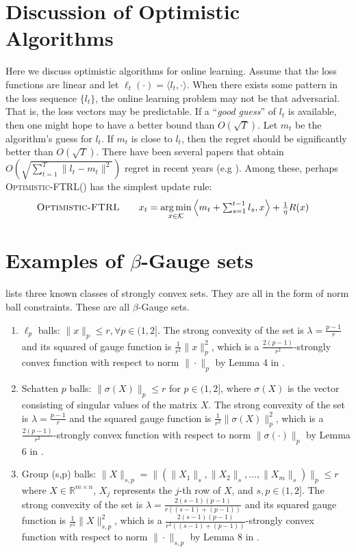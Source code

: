 \documentclass[final,12pt]{colt2018} %
\def\reals{\mathbb{R}}
\def\reals{\mathbb{R}}
\def\K{\mathcal{K}}
\def\argmin{\mathop{\arg\min}}
\def\OFTRL{\textsc{Optimistic-FTRL}\xspace}
\newcommand{\lr}[2]{\left\langle#1,#2\right\rangle}
\begin{document}
\appendix

\section{Discussion of Optimistic Algorithms}\label{app:optimistic}
Here we discuss optimistic algorithms for online learning. Assume that the loss functions are linear and let $\ell_t(\cdot)= \langle l_t , \cdot \rangle$.
When there exists some pattern in the loss sequence $\{ l_t \}$,
the online learning problem may not be that adversarial.
That is, the loss vectors may be predictable. 
If a ``\emph{good guess}'' of $l_t$ is available, then one might hope to have a better bound than $O(\sqrt{T})$. Let $m_t$ be the algorithm's guess for $l_{t}$. If $m_{t}$ is close to $l_{t}$, then the regret should be significantly better than $O(\sqrt{T})$.
There have been several papers that obtain $O(\sqrt{ \sum_{t=1}^T \| l_t -m_t \|^2 } )$ regret in recent years (e.g \cite{CJ12,RK13,SALS15}). 
Among these, perhaps \OFTRL (\cite{SALS15}) has the simplest update rule:
\begin{align}
\OFTRL\quad\quad & x_t = \argmin_{x \in \K}\textstyle \lr{ m_t + \sum_{s=1}^{t-1} l_s }{x} + \frac{1}{\eta} R(x)
\end{align}




\section{Examples of $\beta$-Gauge sets}\label{app:betagauge}
\cite{D15} lists three known classes of strongly convex sets. They are all in the form of norm ball constraints. These are all $\beta$-Gauge sets.
\begin{enumerate}
	\item{$\ell_p$ balls: $\| x \|_p \leq r, \forall p \in (1,2]$. The strong convexity of the set is $\lambda=\frac{p-1}{r}$ and its squared of gauge function is $\frac{1}{r^2} \| x \|_{p}^{2}$, which is a $\frac{2(p-1)}{r^2}$-strongly convex function with respect to norm $\| \cdot \|_p$ by Lemma 4 in \cite{D15}. }
	\item{Schatten $p$ balls: $\| \sigma(X) \|_p \leq r$ for $p \in (1,2]$, where $\sigma(X)$ is the vector consisting of singular values of the matrix $X$. 
		The strong convexity of the set is $\lambda=\frac{p-1}{r}$
		and the squared gauge function is $\frac{1}{r^2} \| \sigma(X) \|_{p}^{2}$, which is a $\frac{2(p-1)}{r^2}$-strongly convex function with respect to norm $\| \sigma(\cdot) \|_p $ by Lemma 6 in \cite{D15}.}
	\item{	Group (s,p) balls: $\| X \|_{s,p}  = \| (\| X_1\|_s, \| X_2\|_s, \dots, \| X_m\|_s)  \|_p \leq r$
		where $X \in \reals^{{m \times n}}$, $X_{j}$ represents the $j$-th row of $X$, and $s,p \in (1,2]$.
		The strong convexity of the set is $\lambda=\frac{2(s-1)(p-1)}{r( (s-1)+(p-1) ) }$ and its squared gauge function is $\frac{1}{r^2} \| X \|_{s,p}^{2}$, which is a $\frac{2(s-1)(p-1)}{r^2( (s-1)+(p-1) ) }$-strongly convex function with respect to norm $\| \cdot\|_{s,p}$ by Lemma 8 in \cite{D15}.}
\end{enumerate}
\end{document}
